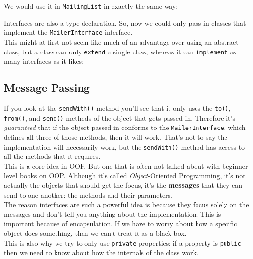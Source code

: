 
We would use it in \texttt{MailingList} in exactly the same way:


Interfaces are also a type declaration. So, now we could only pass in classes that implement the \texttt{MailerInterface} interface.
\\

This might at first not seem like much of an advantage over using an abstract class, but a class can only \texttt{extend} a single class, whereas it can \texttt{implement} as many interfaces as it likes:



\subsection{Message Passing}

If you look at the \texttt{sendWith()} method you'll see that it only uses the \texttt{to()}, \texttt{from()}, and \texttt{send()} methods of the object that gets passed in. Therefore it's \textit{guaranteed} that if the object passed in conforms to the \texttt{MailerInterface}, which defines all three of those methods, then it will work. That's not to say the implementation will necessarily work, but the \texttt{sendWith()} method has access to all the methods that it requires.
\\

This is a core idea in OOP. But one that is often not talked about with beginner level books on OOP. Although it's called \textit{Object}-Oriented Programming, it's not actually the objects that should get the focus, it's the \textbf{messages} that they can send to one another: the methods and their parameters.
\\

The reason interfaces are such a powerful idea is because they focus solely on the messages and don't tell you anything about the implementation. This is important because of encapsulation. If we have to worry about how a specific object does something, then we can't treat it as a black box.
\\

This is also why we try to only use \texttt{private} properties: if a property is \texttt{public} then we need to know about how the internals of the class work.
\\

